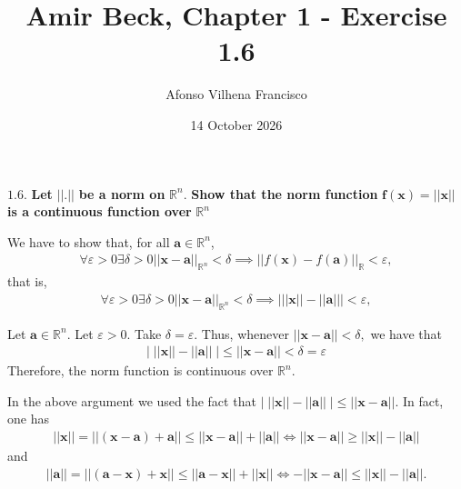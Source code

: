 \documentclass{article}
\title{Amir Beck, Chapter 1 - Exercise 1.6}
\author{Afonso Vilhena Francisco}
\date{14 October 2026}
\begin{document}
\maketitle

$\mathbf{1.6.}$ \textbf{Let} $\mathbf{||.||}$ \textbf{be a norm on} $\mathbb{R}^n.$ \textbf{Show that the norm function} $\mathbf{f(x)=||x||}$  \textbf{is  a continuous function over } $\mathbb{R}^n$

\vspace{0.3cm}

We have to show that, for all $\mathbf{a}\in \mathbb{R}^n$,
\begin{align*}
    \forall \varepsilon>0 \exists \delta>0 ||\mathbf{x}-\mathbf{a}||_{\mathbb{R}^n} < \delta \implies ||f(\mathbf{x})-f(\mathbf{a})||_\mathbb{R}<\varepsilon,
\end{align*}
that is,
\begin{align*}
    \forall \varepsilon>0 \exists \delta>0 ||\mathbf{x}-\mathbf{a}||_{\mathbb{R}^n} < \delta \implies \Big|||\mathbf{x}||-||\mathbf{a}|| \Big| <\varepsilon,
\end{align*}

Let $\mathbf{a} \in \mathbb{R}^n$. Let $\varepsilon>0$. Take $\delta=\varepsilon$. Thus, whenever $||\mathbf{x-a}||< \delta,$ we have that
\begin{align*}
    \Big|\;||\mathbf{x}||-||\mathbf{a}||\;\Big| \leq ||\mathbf{x-a}||< \delta =\varepsilon
\end{align*}
Therefore, the norm function is continuous over $\mathbb{R}^n.$

\vspace{0.2cm}

In the above argument we used the fact that $\Big|\;||\mathbf{x}||-||\mathbf{a}||\;\Big| \leq ||\mathbf{x-a}||$. In fact, one has
\begin{align*}
   ||\mathbf{x}||=||\mathbf{(x-a)+a||} \leq ||\mathbf{x-a}||+||\mathbf{a||} \Leftrightarrow \boxed{ ||\mathbf{x-a}|| \geq ||\mathbf{x}||-||\mathbf{a||}}
\end{align*}
and
\begin{align*}
    ||\mathbf{a}||=||\mathbf{(a-x)+x||} \leq ||\mathbf{a-x}||+||\mathbf{x||} \Leftrightarrow \boxed{ -||\mathbf{x-a}|| \leq ||\mathbf{x}||-||\mathbf{a||}}.
\end{align*}
\end{document}

